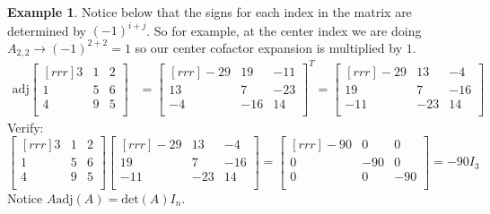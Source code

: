\documentclass{report}
\theoremstyle{plain}
\theoremstyle{definition}
\newtheorem*{ex}{Example}
\theoremstyle{plain}
\begin{document}
\begin{ex}
Notice below that the signs for each index in the matrix are determined by $(-1)^{i+j}$. So for example, at the center index we are doing $A_{2,2} \rightarrow (-1)^{2+2} = 1$ so our center cofactor expansion is multiplied by $1$.
\begin{align*}
\mathrm{adj}\begin{bmatrix}[rrr]3&1&2\\1&5&6\\4&9&5\\\end{bmatrix} &= \begin{bmatrix}[rrr]-29&19&-11\\13&7&-23\\-4&-16&14\\\end{bmatrix}^T=\begin{bmatrix}[rrr]-29&13&-4\\19&7&-16\\-11&-23&14\\\end{bmatrix}
\end{align*}
Verify:
\[ \begin{bmatrix}[rrr]3&1&2\\1&5&6\\4&9&5\\\end{bmatrix}\begin{bmatrix}[rrr]-29&13&-4\\19&7&-16\\-11&-23&14\\\end{bmatrix} = \begin{bmatrix}[rrr]-90&0&0\\0&-90&0\\0&0&-90\\\end{bmatrix} = -90I_3 \]
Notice $A\mathrm{adj}(A)=\mathrm{det}(A)I_n$.
\end{ex}
\end{document}
